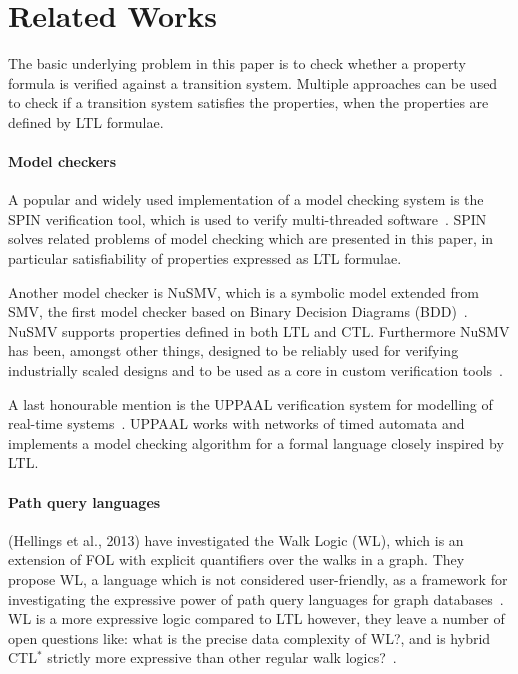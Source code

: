 \section{Related Works}\label{sec:related-works}
The basic underlying problem in this paper is to check whether a property formula is verified against a transition system. Multiple approaches can be used to check if a transition system satisfies the properties, when the properties are defined by LTL formulae.

\paragraph{Model checkers}
A popular and widely used implementation of a model checking system is the SPIN verification tool, which is used to verify multi-threaded software~\cite{spin}. SPIN solves related problems of model checking which are presented in this paper, in particular satisfiability of properties expressed as LTL formulae.

Another model checker is NuSMV, which is a symbolic model extended from SMV, the first model checker based on Binary Decision Diagrams (BDD)~\cite{nusmv}. NuSMV supports properties defined in both LTL and CTL. Furthermore NuSMV has been, amongst other things, designed to be reliably used for verifying industrially scaled designs and to be used as a core in custom verification tools~\cite{nusmv}.

A last honourable mention is the UPPAAL verification system for modelling of real-time systems~\cite{uppaal}. UPPAAL works with networks of timed automata and implements a model checking algorithm for a formal language closely inspired by LTL.

\paragraph{Path query languages}
(Hellings et al., 2013)\cite{hellings2013walk} have investigated the Walk Logic (WL), which is an extension of FOL with explicit quantifiers over the walks in a graph. They propose WL, a language which is not considered user-friendly, as a framework for investigating the expressive power of path query languages for graph databases~\cite{hellings2013walk}. WL is a more expressive logic compared to LTL however, they leave a number of open questions like: what is the precise data complexity of WL?, and is hybrid CTL$^\ast$ strictly more expressive than other regular walk logics?~\cite{hellings2013walk}.

